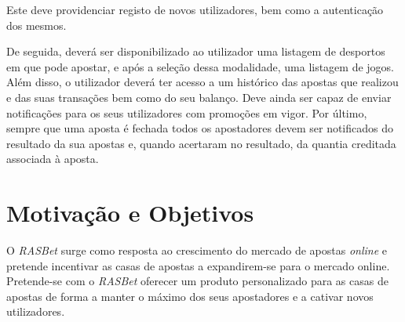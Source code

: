 Este deve providenciar registo de novos utilizadores, bem como a autenticação dos mesmos.

De seguida, deverá ser disponibilizado ao utilizador uma listagem de desportos em que pode apostar, e após a seleção dessa modalidade, uma listagem de jogos. Além disso, o utilizador deverá ter acesso a um histórico das apostas que realizou e das suas transações bem como do seu balanço.
Deve ainda ser capaz de enviar notificações para os seus utilizadores com promoções em vigor. Por último, sempre que uma aposta é fechada todos os apostadores devem ser notificados do resultado da sua apostas e, quando acertaram no resultado, da quantia creditada associada à aposta.

\section{Motivação e Objetivos}
O \textit{RASBet} surge como resposta ao crescimento do mercado de apostas \textit{online} e pretende incentivar as casas de apostas a expandirem-se para o mercado online.
Pretende-se com o \textit{RASBet} oferecer um produto personalizado para as casas de apostas de forma a manter o máximo dos seus apostadores e a cativar novos utilizadores.

\begin{comment}
O recolher de dados e a criação de requisitos de um sistema é uma das fases essenciais no desenvolvimento de qualquer aplicação, daí o seu desenvolvimento ser um dos mais importantes em qualquer projeto. A necessidade de ter um documento que vá de acordo com o que o cliente pretende para um produto final é o desejado para qualquer desenvolvedor.
Assim, temos como objetivo o desenvolvimento completo de um documento que elucide qualquer pessoa, de forma a que esta entenda tudo o que é necessário para o desenvolvimento de um sistema, nomeadamente, um sistema de apostas desportivas. Para isto recorremos a inúmeros diagramas, após a recolha de informação para a criação de requisitos, quer funcionais, quer não funcionais.
\end{comment}








